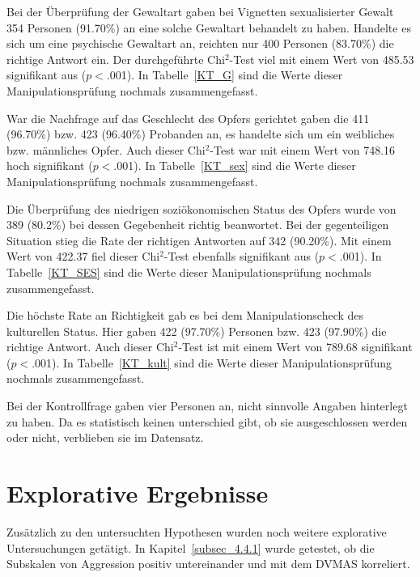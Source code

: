 



Bei der Überprüfung der Gewaltart gaben bei Vignetten sexualisierter Gewalt 354 Personen (91.70\%) an eine solche Gewaltart behandelt zu haben. Handelte es sich um eine psychische Gewaltart an, reichten nur 400 Personen (83.70\%) die richtige Antwort ein. Der durchgeführte Chi$^2$-Test viel mit einem Wert von 485.53 signifikant aus ($p<$.001). 
In Tabelle~\ref{KT_G} sind die Werte dieser Manipulationsprüfung nochmals zusammengefasst.

War die Nachfrage auf das Geschlecht des Opfers gerichtet gaben die 411 (96.70\%) bzw. 423 (96.40\%) Probanden an, es handelte sich um ein weibliches bzw. männliches Opfer. Auch dieser Chi$^2$-Test war mit einem Wert von 748.16 hoch signifikant ($p<$.001). 
In Tabelle~\ref{KT_sex} sind die Werte dieser Manipulationsprüfung nochmals zusammengefasst.

Die Überprüfung des niedrigen soziökonomischen Status des Opfers wurde von 389 (80.2\%) bei dessen Gegebenheit richtig beanwortet. Bei der gegenteiligen Situation stieg die Rate der richtigen Antworten auf 342 (90.20\%). Mit einem Wert von 422.37 fiel dieser Chi$^2$-Test ebenfalls signifikant aus ($p<$.001). 
In Tabelle~\ref{KT_SES} sind die Werte dieser Manipulationsprüfung nochmals zusammengefasst.



Die höchste Rate an Richtigkeit gab es bei dem Manipulationscheck des kulturellen Status. Hier gaben 422 (97.70\%) Personen bzw. 423 (97.90\%) die richtige Antwort. Auch dieser Chi$^2$-Test ist mit einem Wert von 789.68 signifikant ($p<$.001). 
In Tabelle~\ref{KT_kult} sind die Werte dieser Manipulationsprüfung nochmals zusammengefasst.

Bei der Kontrollfrage gaben vier Personen an, nicht sinnvolle Angaben hinterlegt zu haben. Da es statistisch keinen unterschied gibt, ob sie ausgeschlossen werden oder nicht, verblieben sie im Datensatz.


\section{Explorative Ergebnisse}    \label{sec_4.4}
Zusätzlich zu den untersuchten Hypothesen wurden noch weitere explorative Untersuchungen getätigt. In Kapitel~\ref{subsec_4.4.1} wurde getestet, ob die Subskalen von Aggression positiv untereinander und mit dem DVMAS korreliert. 

